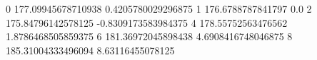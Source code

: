 0 177.09945678710938 0.4205780029296875
1 176.6788787841797 0.0
2 175.84796142578125 -0.8309173583984375
4 178.55752563476562 1.8786468505859375
6 181.36972045898438 4.6908416748046875
8 185.31004333496094 8.63116455078125
